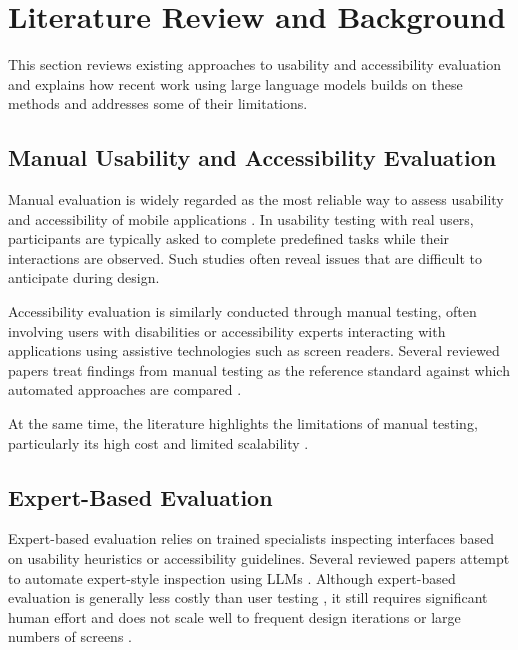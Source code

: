\documentclass[acmsmall,nonacm]{acmart}
\begin{document}
\section{Literature Review and Background}

This section reviews existing approaches to usability and accessibility evaluation and explains how recent work using large language models builds on these methods and addresses some of their limitations.

\subsection{Manual Usability and Accessibility Evaluation}

Manual evaluation is widely regarded as the most reliable way to assess usability and accessibility of mobile applications \cite{hsueh2023llm_ux_testing,xiang2023simuser,zhong2023synthetic_heuristic,zhong2024screenaudit}. In usability testing with real users, participants are typically asked to complete predefined tasks while their interactions are observed. Such studies often reveal issues that are difficult to anticipate during design.

Accessibility evaluation is similarly conducted through manual testing, often involving users with disabilities or accessibility experts interacting with applications using assistive technologies such as screen readers. Several reviewed papers treat findings from manual testing as the reference standard against which automated approaches are compared \cite{xiang2023simuser,zhong2023synthetic_heuristic,zhong2024screenaudit}.

At the same time, the literature highlights the limitations of manual testing, particularly its high cost and limited scalability \cite{hsueh2023llm_ux_testing,xiang2023simuser,zhong2023synthetic_heuristic,zhong2024screenaudit}.

\subsection{Expert-Based Evaluation}

Expert-based evaluation relies on trained specialists inspecting interfaces based on usability heuristics or accessibility guidelines. Several reviewed papers attempt to automate expert-style inspection using LLMs \cite{zhong2023synthetic_heuristic,wang2024aiheureval,yang2023uisgpt}. Although expert-based evaluation is generally less costly than user testing \cite{nielsen1994usability_inspection}, it still requires significant human effort and does not scale well to frequent design iterations or large numbers of screens \cite{wang2024aiheureval}.
\end{document}

